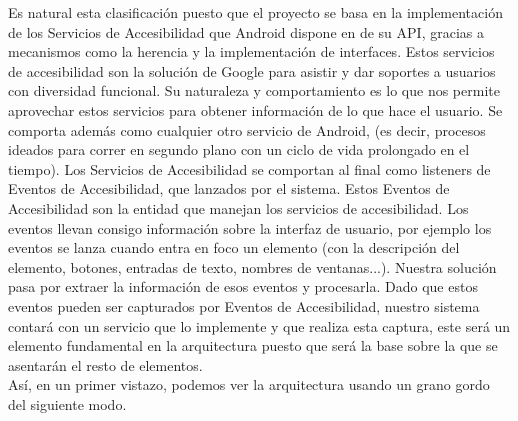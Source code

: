 \documentclass[12pt,a4paper,oneside]{book} %
\begin{document}
Es natural esta clasificación puesto que el proyecto se basa en la implementación de los Servicios de Accesibilidad que Android dispone en de su API, gracias a mecanismos como la herencia y la implementación de interfaces. 
\newline \newline
Estos servicios de accesibilidad son la solución de Google para asistir y dar soportes a usuarios con diversidad funcional. Su naturaleza y comportamiento es lo que nos permite aprovechar estos servicios para obtener información de lo que hace el usuario. 
\newline \newline
Se comporta además como cualquier otro servicio de Android, (es decir, procesos ideados para correr en segundo plano con un ciclo de vida prolongado en el tiempo). Los Servicios de Accesibilidad se comportan al final como listeners de Eventos de Accesibilidad, que lanzados por el sistema. Estos Eventos de Accesibilidad son la entidad que manejan los servicios de accesibilidad. 
\newline \newline
Los eventos llevan consigo información sobre la interfaz de usuario, por ejemplo los eventos se lanza cuando entra en foco un elemento (con la descripción del elemento, botones, entradas de texto, nombres de ventanas...). Nuestra solución pasa por extraer la información de esos eventos y procesarla. 
\newline \newline
Dado que estos eventos pueden ser capturados por Eventos de Accesibilidad, nuestro sistema contará con un servicio que lo implemente y que realiza esta captura, este será un elemento fundamental en la arquitectura puesto que será la base sobre la que se asentarán el resto de elementos. 
\\
Así, en un primer vistazo, podemos ver la arquitectura usando un grano gordo del siguiente modo. 
\end{document}
